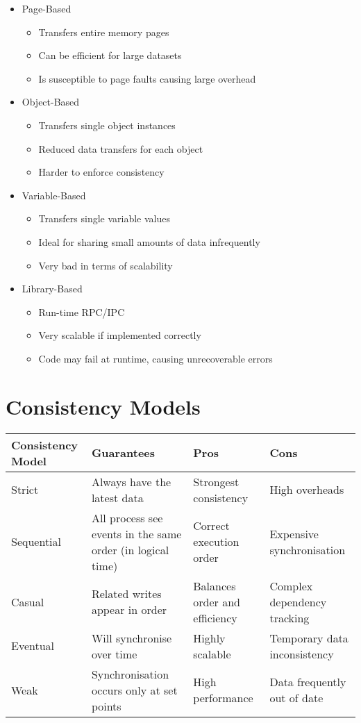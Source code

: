 \begin{itemize}
  \item Page-Based
  \begin{itemize}
    \item Transfers entire memory pages
    \item Can be efficient for large datasets
    \item Is susceptible to page faults causing large overhead
  \end{itemize}
  \item Object-Based
  \begin{itemize}
    \item Transfers single object instances
    \item Reduced data transfers for each object
    \item Harder to enforce consistency
  \end{itemize}
  \item Variable-Based
  \begin{itemize}
    \item Transfers single variable values
    \item Ideal for sharing small amounts of data infrequently
    \item Very bad in terms of scalability
  \end{itemize}
  \item Library-Based
  \begin{itemize}
    \item Run-time RPC/IPC
    \item Very scalable if implemented correctly
    \item Code may fail at runtime, causing unrecoverable errors
  \end{itemize}
\end{itemize}

\section*{Consistency Models}

\begin{center}
  \begin{tabular}{ p{} p{} p{} p{}}
  Consistency Model & Guarantees & Pros & Cons\\
  \hline
  Strict & Always have the latest data & Strongest consistency & High overheads\\
  Sequential & All process see events in the same order (in logical time) & Correct execution order & Expensive synchronisation\\
  Casual & Related writes appear in order & Balances order and efficiency & Complex dependency tracking\\
  Eventual & Will synchronise over time & Highly scalable & Temporary data inconsistency\\
  Weak & Synchronisation occurs only at set points & High performance & Data frequently out of date\\
  \end{tabular}
\end{center}

